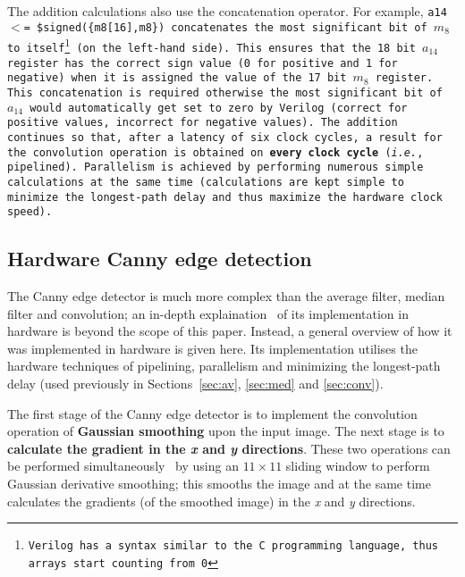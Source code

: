 \documentclass[10pt,twocolumn,letterpaper]{article}
\begin{document}
The addition calculations also use the concatenation operator. For example,
\tt \footnotesize a14 $<$= \$signed(\{m8[16],m8\}) \normalsize \rm concatenates
the most significant bit of 
$m_{8}$ to itself\footnote{Verilog has a syntax similar to the C programming language, 
thus arrays start counting from 0}
(on the left-hand side).
This ensures
that the 18 bit 
$a_{14}$ register has the correct sign value (0 for positive and 1 for negative)
when it is assigned the value of the 17 bit 
$m_{8}$ register.
This concatenation is required otherwise the most significant bit of  
$a_{14}$ would automatically get set to zero by Verilog 
(correct for positive values, incorrect for negative values).
The addition continues 
so that, after a latency of six clock cycles, a result for the convolution
operation is obtained on {\bf every clock cycle} (\emph{i.e.}, pipelined). 
Parallelism is achieved by performing numerous simple calculations at the same time
(calculations are kept simple to minimize the longest-path delay and thus maximize the hardware clock speed).


\subsection{Hardware Canny edge detection}
The Canny edge detector is much more complex than the average filter, median filter and convolution; an in-depth
explaination~\cite{msp05, canny86, IPtechreport_MSThesis} of its implementation in hardware is beyond the scope of this paper. 
Instead, a general overview of how it was implemented in hardware is given here. 
Its implementation utilises the hardware techniques of 
pipelining, parallelism and minimizing the longest-path delay (used previously in Sections~\ref{sec:av}, \ref{sec:med} 
and \ref{sec:conv}).

The first stage of the Canny edge detector is to implement the convolution operation of {\bf Gaussian smoothing} upon the input image.
The next stage is to {\bf calculate the gradient in the \emph{x} and \emph{y} directions}.
These two operations can be performed simultaneously~\cite{msp05} by 
using an $11\times11$ sliding window to perform Gaussian derivative smoothing;
this smooths the image and at the same time calculates the gradients (of the smoothed image) in the \emph{x} and \emph{y} directions.
\end{document}
